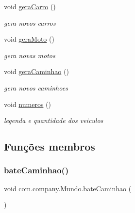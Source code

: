 \begin{DoxyCompactItemize}
\mbox{\label{classcom_1_1company_1_1_mundo_a9b4b7ab2613e1ea384082f88ac058b16}} 
void \mbox{\hyperlink{classcom_1_1company_1_1_mundo_a9b4b7ab2613e1ea384082f88ac058b16}{gera\+Carro}} ()
\begin{DoxyCompactList}\small\item\em gera novos carros \end{DoxyCompactList}\item 
\mbox{\label{classcom_1_1company_1_1_mundo_a4bba8d8f6f846ec65facf10196d7c619}} 
void \mbox{\hyperlink{classcom_1_1company_1_1_mundo_a4bba8d8f6f846ec65facf10196d7c619}{gera\+Moto}} ()
\begin{DoxyCompactList}\small\item\em gera novas motos \end{DoxyCompactList}\item 
\mbox{\label{classcom_1_1company_1_1_mundo_ad0ce55f809bf999ee3271c6e970561dc}} 
void \mbox{\hyperlink{classcom_1_1company_1_1_mundo_ad0ce55f809bf999ee3271c6e970561dc}{gera\+Caminhao}} ()
\begin{DoxyCompactList}\small\item\em gera novos caminhoes \end{DoxyCompactList}\item 
void \mbox{\hyperlink{classcom_1_1company_1_1_mundo_afd89839275a49ac20884b5e402ae374a}{numeros}} ()
\begin{DoxyCompactList}\small\item\em legenda e quantidade dos veiculos \end{DoxyCompactList}\end{DoxyCompactItemize}


\subsection{Funções membros}
\mbox{\label{classcom_1_1company_1_1_mundo_acd75d27967e52000cf6558424daa34c7}} 
\subsubsection{\texorpdfstring{bate\+Caminhao()}{bateCaminhao()}}
{\footnotesize\ttfamily void com.\+company.\+Mundo.\+bate\+Caminhao (\begin{DoxyParamCaption}{ }\end{DoxyParamCaption})\hspace{0.3cm}{\ttfamily [inline]}}



